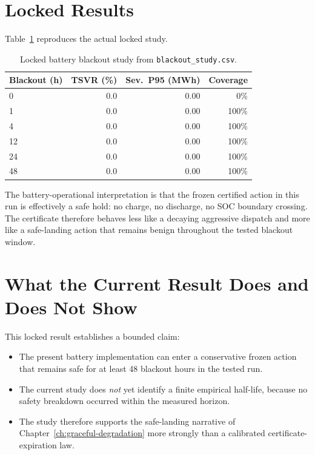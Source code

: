 \section{Locked Results}

Table~\ref{tab:blackout-study} reproduces the actual locked study.

\begin{table}[ht]
\centering
\caption{Locked battery blackout study from \texttt{blackout\_study.csv}.}
\label{tab:blackout-study}
\begin{tabular}{lrrr}
\toprule
\textbf{Blackout (h)} & \textbf{TSVR (\%)} & \textbf{Sev.\ P95 (MWh)} & \textbf{Coverage} \\
\midrule
  0  & 0.0 & 0.00 &   0\% \\
  1  & 0.0 & 0.00 & 100\% \\
  4  & 0.0 & 0.00 & 100\% \\
 12  & 0.0 & 0.00 & 100\% \\
 24  & 0.0 & 0.00 & 100\% \\
 48  & 0.0 & 0.00 & 100\% \\
\bottomrule
\end{tabular}
\end{table}

The battery-operational interpretation is that the frozen certified action in
this run is effectively a safe hold: no charge, no discharge, no SOC
boundary crossing.  The certificate therefore behaves less like a decaying
aggressive dispatch and more like a safe-landing action that remains benign
throughout the tested blackout window.

\section{What the Current Result Does and Does Not Show}

This locked result establishes a bounded claim:

\begin{itemize}
  \item The present battery implementation can enter a conservative frozen
    action that remains safe for at least 48 blackout hours in the tested run.
  \item The current study does \emph{not} yet identify a finite empirical
    half-life, because no safety breakdown occurred within the measured
    horizon.
  \item The study therefore supports the safe-landing narrative of
    Chapter~\ref{ch:graceful-degradation} more strongly than a
    calibrated certificate-expiration law.
\end{itemize}

